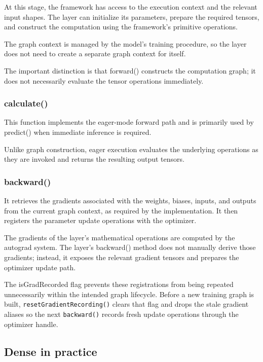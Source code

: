 At this stage, the framework has access to the
execution context and the relevant input shapes.
The layer can initialize its parameters, prepare
the required tensors, and construct the
computation using the framework's primitive
operations.

The graph context is managed by the model's
training procedure, so the layer does not
need to create a separate graph context for
itself.

The important distinction is that forward()
constructs the computation graph; it does not
necessarily evaluate the tensor operations
immediately.

\subsubsection{calculate()}
This function implements the eager-mode
forward path and is primarily used by
predict() when immediate inference is
required.

Unlike graph construction, eager execution
evaluates the underlying operations as they
are invoked and returns the resulting
output tensors.

\subsubsection{backward()}
It retrieves the gradients associated with
the weights, biases, inputs, and outputs
from the current graph context, as required
by the implementation. It then registers
the parameter update operations with the
optimizer.

The gradients of the layer's mathematical
operations are computed by the autograd
system. The layer's backward() method
does not manually derive those gradients;
instead, it exposes the relevant gradient
tensors and prepares the optimizer update path.

The isGradRecorded flag prevents these
registrations from being repeated unnecessarily
within the intended graph lifecycle. Before a new
training graph is built, \texttt{resetGradientRecording()} clears that flag and
drops the stale gradient aliases so the next \texttt{backward()} records fresh
update operations through the optimizer handle.

\subsection{Dense in practice}

